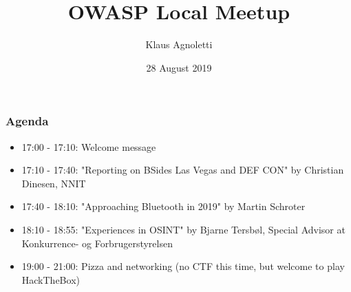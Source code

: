 \documentclass[aspectratio=169,xcolor={dvipsnames}]{beamer}
\title{OWASP Local Meetup}
\date{28 August 2019}
\author{Klaus Agnoletti}
\institute{}
\begin{document}
\begin{frame}
  \titlepage
\end{frame}



\begin{frame}
  \frametitle{Agenda}
  \begin{itemize}

  \item 17:00 - 17:10: Welcome message
  \item 17:10 - 17:40: "Reporting on BSides Las Vegas and DEF CON" by Christian Dinesen, NNIT
  \item 17:40 - 18:10: "Approaching Bluetooth in 2019" by Martin Schroter
  \item 18:10 - 18:55: "Experiences in OSINT" by Bjarne Tersbøl, Special Advisor at Konkurrence- og Forbrugerstyrelsen
  \item 19:00 - 21:00: Pizza and networking (no CTF this time, but welcome to play HackTheBox)

  \end{itemize}
\end{frame}
\end{document}
